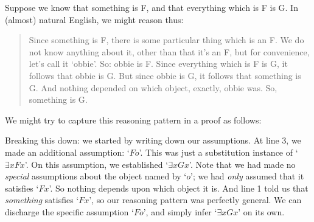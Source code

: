 Suppose we know that something is F, and that everything which is F is G. In (almost) natural English, we might reason thus:
	\begin{quote}
		Since something is F, there is some particular thing which is an F. We do not know anything about it, other than that it's an F, but for convenience, let's call it `obbie'. So: obbie is F. Since everything which is F is G, it follows that obbie is G. But since obbie is G, it follows that something is G. And nothing depended on which object, exactly, obbie was. So, something is G.
	\end{quote}
We might try to capture this reasoning pattern in a proof as follows:
\begin{fitchproof}
	\open
		 
	\close
\end{fitchproof}\noindent
Breaking this down: we started by writing down our assumptions. At line 3, we made an additional assumption: `$Fo$'. This was just a substitution instance of `$\exists x Fx$'. On this assumption, we established `$\exists x Gx$'. Note that we had made no \emph{special} assumptions about the object named by `$o$'; we had \emph{only} assumed that it satisfies `$Fx$'. So nothing depends upon which object it is. And line 1 told us that \emph{something} satisfies `$Fx$', so our reasoning pattern was perfectly general. We can discharge the specific assumption `$Fo$', and simply infer `$\exists x Gx$' on its own.


